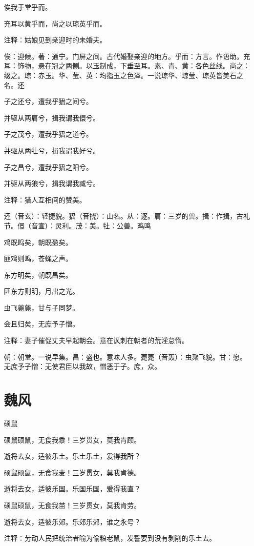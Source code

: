 \documentclass[12pt,UTF8]{ctexbook}
\begin{document}
俟我于堂乎而。

充耳以黄乎而，尚之以琼英乎而。

注释：姑娘见到亲迎时的未婚夫。

俟：迎候。著：通宁。门屏之间。古代婚娶亲迎的地方。乎而：方言。作语助。充耳：饰物，悬在冠之两侧。以玉制成，下垂至耳。素、青、黄：各色丝线。尚之：缀之。琼：赤玉。华、莹、英：均指玉之色泽。一说琼华、琼莹、琼英皆美石之名。还

子之还兮，遭我乎峱之间兮。

并驱从两肩兮，揖我谓我儇兮。

子之茂兮，遭我乎峱之道兮。

并驱从两牡兮，揖我谓我好兮。

子之昌兮，遭我乎峱之阳兮。

并驱从两狼兮，揖我谓我臧兮。

注释：猎人互相间的赞美。

还（音玄）：轻捷貌。峱（音挠）：山名。从：逐。肩：三岁的兽。揖：作揖，古礼节。儇（音宣）：灵利。茂：美。牡：公兽。鸡鸣

鸡既鸣矣，朝既盈矣。

匪鸡则鸣，苍蝇之声。

东方明矣，朝既昌矣。

匪东方则明，月出之光。

虫飞薨薨，甘与子同梦。

会且归矣，无庶予子憎。

注释：妻子催促丈夫早起朝会。意在讽刺在朝者的荒淫怠惰。

朝：朝堂。一说早集。昌：盛也。意味人多。薨薨（音轰）：虫聚飞貌。甘：愿。无庶予子憎：无使君臣以我故，憎恶于子。庶，众。



\part{魏风}

硕鼠

硕鼠硕鼠，无食我黍！三岁贯女，莫我肯顾。

逝将去女，适彼乐土。乐土乐土，爰得我所？

硕鼠硕鼠，无食我麦！三岁贯女，莫我肯德。

逝将去女，适彼乐国。乐国乐国，爰得我直？

硕鼠硕鼠，无食我苗！三岁贯女，莫我肯劳。

逝将去女，适彼乐郊。乐郊乐郊，谁之永号？

注释：劳动人民把统治者喻为偷粮老鼠，发誓要到没有剥削的乐土去。
\end{document}
